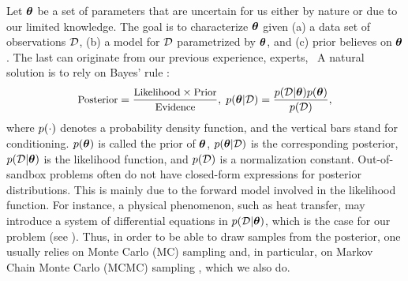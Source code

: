 Let ${\boldsymbol\theta}$ be a set of parameters that are uncertain for us either by nature or due to our limited knowledge. The goal is to characterize ${\boldsymbol\theta}$ given (a) a data set of observations $\mathcal{D}$, (b) a model for $\mathcal{D}$ parametrized by ${\boldsymbol\theta}$, and (c) prior believes on ${\boldsymbol\theta}$. The last can originate from our previous experience, experts, \etc\ A natural solution is to rely on Bayes' rule \cite{gelman2004}:
\begin{equation} \elabel{bayes}
  \text{\small Posterior} = \frac{\text{\small Likelihood} \times \text{\small Prior}}{\text{\small Evidence}}, \; \f{\vparam | \Data} = \frac{\f{\Data | \vparam} \f{\vparam}}{\f{\Data}},
\end{equation}
where $\f{\cdot}$ denotes a probability density function, and the vertical bars stand for conditioning. $\f{\vparam}$ is called the prior of ${\boldsymbol\theta}$, $\f{\vparam | \Data}$ is the corresponding posterior, $\f{\Data | \vparam}$ is the likelihood function, and $\f{\Data}$ is a normalization constant.
Out-of-sandbox problems often do not have closed-form expressions for posterior distributions. This is mainly due to the forward model involved in the likelihood function. For instance, a physical phenomenon, such as heat transfer, may introduce a system of differential equations in $\f{\Data | \vparam}$, which is the case for our problem (see ).
Thus, in order to be able to draw samples from the posterior, one usually relies on Monte Carlo (MC) sampling and, in particular, on Markov Chain Monte Carlo (MCMC) sampling \cite{gelman2004}, which we also do.
